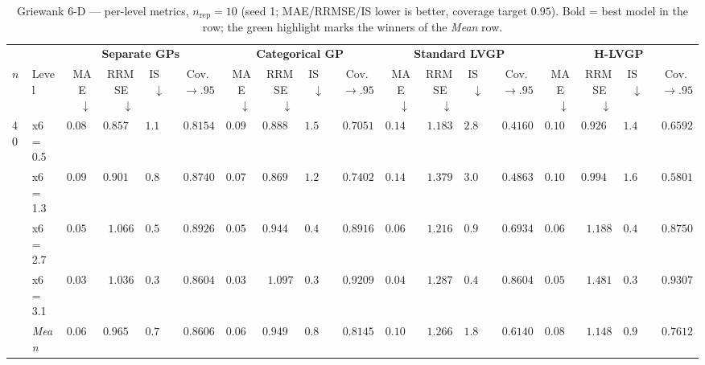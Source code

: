 \begin{table}[htbp]
\centering
\scriptsize
\setlength{\tabcolsep}{2.5pt}
\setlength{\fboxsep}{1pt}
\caption{Griewank 6-D --- per-level metrics, $n_{\mathrm{rep}}=10$ (seed 1; MAE/RRMSE/IS lower is better, coverage target $0.95$). Bold = best model in the row; the green highlight marks the winners of the \emph{Mean} row.}
\label{tab:griewank_6d_nrep10}
\begin{tabular}{llrrrrrrrrrrrrrrrr}
\toprule
 & & \multicolumn{4}{c}{\textbf{Separate GPs}} & \multicolumn{4}{c}{\textbf{Categorical GP}} & \multicolumn{4}{c}{\textbf{Standard LVGP}} & \multicolumn{4}{c}{\textbf{H-LVGP}} \\
\cmidrule(lr){3-6} \cmidrule(lr){7-10} \cmidrule(lr){11-14} \cmidrule(lr){15-18}
$n$ & Level & MAE~$\downarrow$ & RRMSE~$\downarrow$ & IS~$\downarrow$ & Cov.~$\to.95$ & MAE~$\downarrow$ & RRMSE~$\downarrow$ & IS~$\downarrow$ & Cov.~$\to.95$ & MAE~$\downarrow$ & RRMSE~$\downarrow$ & IS~$\downarrow$ & Cov.~$\to.95$ & MAE~$\downarrow$ & RRMSE~$\downarrow$ & IS~$\downarrow$ & Cov.~$\to.95$ \\
\midrule
\multirow{5}{*}{40} & x6 = 0.5 & {\boldmath$0.0862$} & {\boldmath$0.8571$} & {\boldmath$1.198$} & {\boldmath$0.8154$} & $0.0917$ & $0.8883$ & $1.577$ & $0.7051$ & $0.1465$ & $1.183$ & $2.838$ & $0.4160$ & $0.1047$ & $0.9267$ & $1.456$ & $0.6592$ \\
 & x6 = 1.3 & $0.0930$ & $0.9010$ & {\boldmath$0.8643$} & {\boldmath$0.8740$} & {\boldmath$0.0780$} & {\boldmath$0.8692$} & $1.254$ & $0.7402$ & $0.1420$ & $1.379$ & $3.012$ & $0.4863$ & $0.1034$ & $0.9944$ & $1.687$ & $0.5801$ \\
 & x6 = 2.7 & $0.0564$ & $1.066$ & $0.5188$ & {\boldmath$0.8926$} & {\boldmath$0.0500$} & {\boldmath$0.9440$} & {\boldmath$0.4207$} & $0.8916$ & $0.0665$ & $1.216$ & $0.9542$ & $0.6934$ & $0.0648$ & $1.188$ & $0.4539$ & $0.8750$ \\
 & x6 = 3.1 & {\boldmath$0.0322$} & {\boldmath$1.036$} & $0.3945$ & $0.8604$ & $0.0390$ & $1.097$ & {\boldmath$0.3191$} & $0.9209$ & $0.0462$ & $1.287$ & $0.4803$ & $0.8604$ & $0.0546$ & $1.481$ & $0.3397$ & {\boldmath$0.9307$} \\
 & \textit{Mean} & $0.0669$ & $0.9651$ & \colorbox{green!20}{\boldmath$0.7438$} & \colorbox{green!20}{\boldmath$0.8606$} & \colorbox{green!20}{\boldmath$0.0647$} & \colorbox{green!20}{\boldmath$0.9497$} & $0.8928$ & $0.8145$ & $0.1003$ & $1.266$ & $1.821$ & $0.6140$ & $0.0819$ & $1.148$ & $0.9839$ & $0.7612$ \\
\midrule

\end{tabular}
\end{table}

